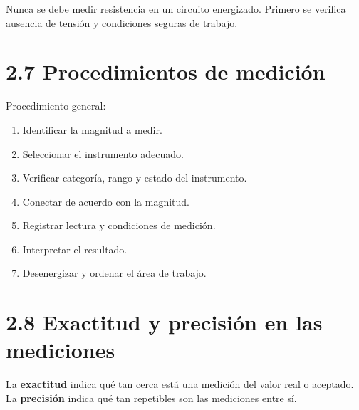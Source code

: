 \documentclass[
  spanish,
  letterpaper,
  DIV=11,
  numbers=noendperiod]{scrreprt}
\providecommand{\tightlist}{%
  \setlength{\itemsep}{0pt}\setlength{\parskip}{0pt}}
\begin{document}
\begin{tcolorbox}[enhanced jigsaw, arc=.35mm, bottomrule=.15mm, bottomtitle=1mm, breakable, colback=white, colbacktitle=quarto-callout-warning-color!10!white, colframe=quarto-callout-warning-color-frame, coltitle=black, left=2mm, leftrule=.75mm, opacityback=0, opacitybacktitle=0.6, rightrule=.15mm, title=\textcolor{quarto-callout-warning-color}{\faExclamationTriangle}\hspace{0.5em}{Seguridad de medición}, titlerule=0mm, toprule=.15mm, toptitle=1mm]

Nunca se debe medir resistencia en un circuito energizado. Primero se
verifica ausencia de tensión y condiciones seguras de trabajo.

\end{tcolorbox}

\section{2.7 Procedimientos de
medición}\label{procedimientos-de-mediciuxf3n}

Procedimiento general:

\begin{enumerate}
\def\labelenumi{\arabic{enumi}.}
\tightlist
\item
  Identificar la magnitud a medir.
\item
  Seleccionar el instrumento adecuado.
\item
  Verificar categoría, rango y estado del instrumento.
\item
  Conectar de acuerdo con la magnitud.
\item
  Registrar lectura y condiciones de medición.
\item
  Interpretar el resultado.
\item
  Desenergizar y ordenar el área de trabajo.
\end{enumerate}

\section{2.8 Exactitud y precisión en las
mediciones}\label{exactitud-y-precisiuxf3n-en-las-mediciones}

La \textbf{exactitud} indica qué tan cerca está una medición del valor
real o aceptado. La \textbf{precisión} indica qué tan repetibles son las
mediciones entre sí.
\end{document}
